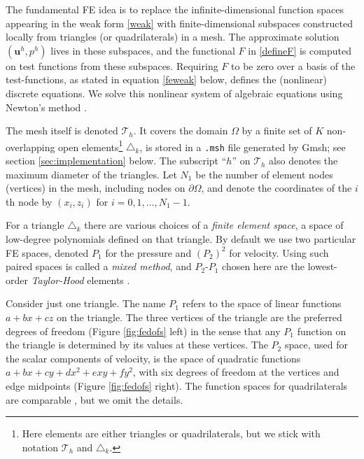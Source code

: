 \documentclass[letterpaper,final,12pt,reqno]{amsart}
\newcommand{\bu}{\mathbf{u}}
\begin{document}
The fundamental FE idea is to replace the infinite-dimensional function spaces appearing in the weak form \eqref{weak} with finite-dimensional subspaces constructed locally from triangles (or quadrilaterals) in a mesh.  The approximate solution $(\bu^h,p^h)$ lives in these subspaces, and the functional $F$ in \eqref{defineF} is computed on test functions from these subspaces.  Requiring $F$ to be zero over a basis of the test-functions, as stated in equation \eqref{feweak} below, defines the (nonlinear) discrete equations.  We solve this nonlinear system of algebraic equations using Newton's method \cite{Bueler2021}.

The mesh itself is denoted $\mathcal{T}_h$.  It covers the domain $\Omega$ by a finite set of $K$ non-overlapping open elements\footnote{Here elements are either triangles or quadrilaterals, but we stick with notation $\mathcal{T}_h$ and $\triangle_k$.} $\triangle_k$, is stored in a \texttt{.msh} file generated by Gmsh; see section \ref{sec:implementation} below.  The subscript ``$h$'' on $\mathcal{T}_h$ also denotes the maximum diameter of the triangles.  Let $N_1$ be the number of element nodes (vertices) in the mesh, including nodes on $\partial\Omega$, and denote the coordinates of the $i$th node by $(x_i,z_i)$ for $i=0,1,\dots,N_1-1$.

For a triangle $\triangle_k$ there are various choices of a \emph{finite element space}, a space of low-degree polynomials defined on that triangle.  By default we use two particular FE spaces, denoted $P_1$ for the pressure and $(P_2)^2$ for velocity.  Using such paired spaces is called a \emph{mixed method}, and $P_2$-$P_1$ chosen here are the lowest-order \emph{Taylor-Hood} elements \cite{Elmanetal2014}.

Consider just one triangle.  The name $P_1$ refers to the space of linear functions $a + b x + c z$ on the triangle.  The three vertices of the triangle are the preferred degrees of freedom (Figure \ref{fig:fedofs} left) in the sense that any $P_1$ function on the triangle is determined by its values at these vertices.  The $P_2$ space, used for the scalar components of velocity, is the space of quadratic functions $a + bx + cy + dx^2 + exy + fy^2$, with six degrees of freedom at the vertices and edge midpoints (Figure \ref{fig:fedofs} right).  The function spaces for quadrilaterals are comparable \cite{Elmanetal2014}, but we omit the details.
\end{document}
